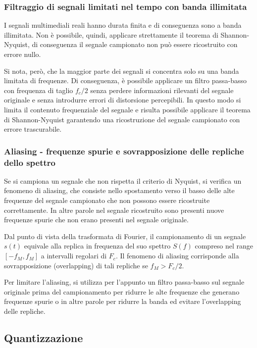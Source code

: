 \subsubsection*{Filtraggio di segnali limitati nel tempo con banda illimitata}
I segnali multimediali reali hanno durata finita e di conseguenza sono a banda illimitata. Non è possibile, quindi, applicare
strettamente il teorema di Shannon-Nyquist, di conseguenza il segnale campionato non può essere ricostruito con errore nullo.

Si nota, però, che la maggior parte dei segnali si concentra solo su una banda limitata di frequenze. Di conseguenza,
è possibile applicare un filtro passa-basso con frequenza di taglio \(f_c/2\) senza perdere informazioni rilevanti del
segnale originale e senza introdurre errori di distorsione percepibili. In questo modo si limita il contenuto frequenziale
del segnale e risulta possibile applicare il teorema di Shannon-Nyquist garantendo una ricostruzione del segnale campionato
con errore trascurabile.

\subsubsection*{Aliasing - frequenze spurie e sovrapposizione delle repliche dello spettro}
Se si campiona un segnale che non rispetta il criterio di Nyquist, si verifica un fenomeno di aliasing, che consiste nello
spostamento verso il basso delle alte frequenze del segnale campionato che non possono essere ricostruite correttamente.
In altre parole nel segnale ricostruito sono presenti nuove frequenze spurie che non erano presenti nel segnale originale.

Dal punto di vista della trasformata di Fourier, il campionamento di un segnale \(s(t)\) equivale alla replica in
frequenza del suo spettro \(S(f)\) compreso nel range \([-f_M, f_M]\) a intervalli regolari di \(F_c\). Il fenomeno
di aliasing corrisponde alla sovrapposizione (overlapping) di tali repliche se \(f_M > F_c/2\).

Per limitare l'aliasing, si utilizza per l'appunto un filtro passa-basso sul segnale originale prima del campionamento
per ridurre le alte frequenze che generano frequenze spurie o in altre parole per ridurre la banda ed evitare l'overlapping
delle repliche.

\newpage


\subsection{Quantizzazione}
